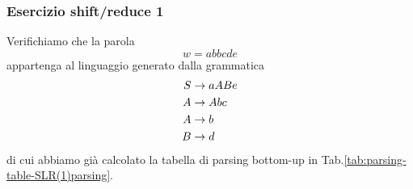 \documentclass[class=book, crop=false, oneside, 12pt]{standalone}
\begin{document}
\subsubsection{Esercizio shift/reduce 1}
Verifichiamo che la parola
\begin{equation*}
    w = abbcde
\end{equation*}
appartenga al linguaggio generato dalla grammatica
\begin{align}
    \label{grammar-ex-sh/re-1}
    S &\to aABe \\
    A &\to Abc \nonumber \\ \notag
    A &\to b \nonumber \\ \notag
    B &\to d  \nonumber \notag
\end{align}
di cui abbiamo già calcolato la tabella di parsing bottom-up in Tab.\ref{tab:parsing-table-SLR(1)parsing}.
\end{document}
